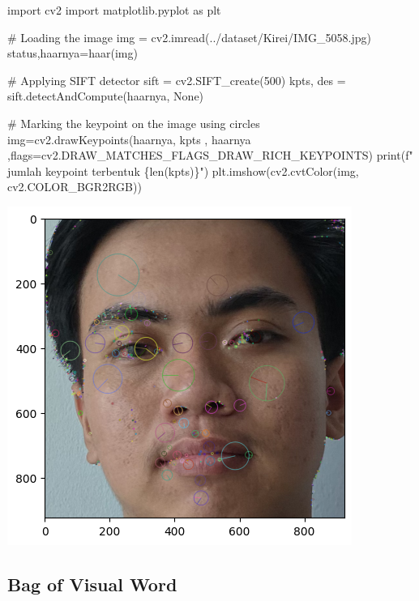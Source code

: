 \documentclass[
  letterpaper,
  DIV=11,
  numbers=noendperiod]{scrreprt}
\newenvironment{Shaded}{\begin{snugshade}}{\end{snugshade}}
\newcommand{\BuiltInTok}[1]{\textcolor[rgb]{0.00,0.23,0.31}{#1}}
\newcommand{\CommentTok}[1]{\textcolor[rgb]{0.37,0.37,0.37}{#1}}
\newcommand{\DecValTok}[1]{\textcolor[rgb]{0.68,0.00,0.00}{#1}}
\newcommand{\ImportTok}[1]{\textcolor[rgb]{0.00,0.46,0.62}{#1}}
\newcommand{\NormalTok}[1]{\textcolor[rgb]{0.00,0.23,0.31}{#1}}
\newcommand{\OperatorTok}[1]{\textcolor[rgb]{0.37,0.37,0.37}{#1}}
\newcommand{\SpecialCharTok}[1]{\textcolor[rgb]{0.37,0.37,0.37}{#1}}
\newcommand{\SpecialStringTok}[1]{\textcolor[rgb]{0.13,0.47,0.30}{#1}}
\newcommand{\StringTok}[1]{\textcolor[rgb]{0.13,0.47,0.30}{#1}}
\newcommand{\VariableTok}[1]{\textcolor[rgb]{0.07,0.07,0.07}{#1}}
\begin{document}
\begin{Shaded}
\begin{Highlighting}[]
\ImportTok{import}\NormalTok{ cv2}
\ImportTok{import}\NormalTok{ matplotlib.pyplot }\ImportTok{as}\NormalTok{ plt}

\CommentTok{\# Loading the image}
\NormalTok{img }\OperatorTok{=}\NormalTok{ cv2.imread(}\StringTok{\textquotesingle{}../dataset/Kirei/IMG\_5058.jpg\textquotesingle{}}\NormalTok{)}
\NormalTok{status,haarnya}\OperatorTok{=}\NormalTok{haar(img)  }

\CommentTok{\# Applying SIFT detector}
\NormalTok{sift }\OperatorTok{=}\NormalTok{ cv2.SIFT\_create(}\DecValTok{500}\NormalTok{)}
\NormalTok{kpts, des }\OperatorTok{=}\NormalTok{ sift.detectAndCompute(haarnya, }\VariableTok{None}\NormalTok{)  }

\CommentTok{\# Marking the keypoint on the image using circles}
\NormalTok{img}\OperatorTok{=}\NormalTok{cv2.drawKeypoints(haarnya, kpts , haarnya ,flags}\OperatorTok{=}\NormalTok{cv2.DRAW\_MATCHES\_FLAGS\_DRAW\_RICH\_KEYPOINTS)}
\BuiltInTok{print}\NormalTok{(}\SpecialStringTok{f" jumlah keypoint terbentuk }\SpecialCharTok{\{}\BuiltInTok{len}\NormalTok{(kpts)}\SpecialCharTok{\}}\SpecialStringTok{"}\NormalTok{)}
\NormalTok{plt.imshow(cv2.cvtColor(img, cv2.COLOR\_BGR2RGB))}
\end{Highlighting}
\end{Shaded}

\includegraphics{Asset/sift.png}

\hypertarget{bag-of-visual-word-1}{%
\subsection*{Bag of Visual Word}\label{bag-of-visual-word-1}}
\end{document}
